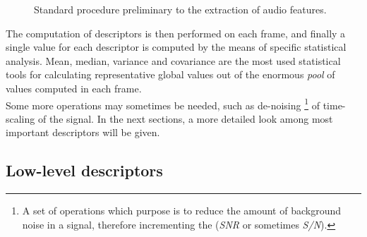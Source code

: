 \begin{figure}\hskip -1cm
\caption{Standard procedure preliminary to the extraction of audio features.}
\label{fig:extraction}
\end{figure}

The computation of descriptors is then performed on each frame, and finally a single value for each descriptor is computed by the means of specific statistical analysis. Mean, median, variance and covariance are the most used statistical tools for calculating representative global values out of the enormous \textit{pool} of values computed in each frame.\\
Some more operations may sometimes be needed, such as de-noising \footnote{A set of operations which purpose is to reduce the amount of background noise in a signal, therefore incrementing the  (\textit{SNR} or sometimes \textit{S/N}).} of time-scaling of the signal. In the next sections, a more detailed look among most important descriptors will be given.

\subsection{Low-level descriptors}
